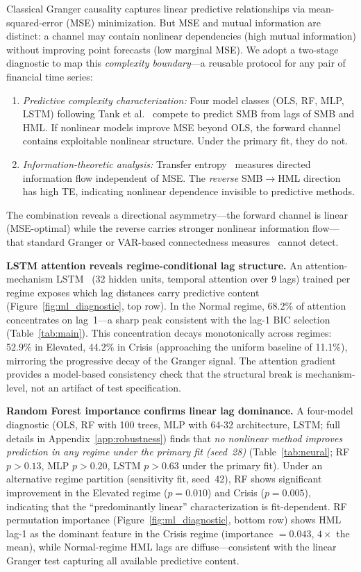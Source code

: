 \documentclass[sigconf,anonymous]{acmart}
\begin{document}
Classical Granger causality captures linear predictive relationships via
mean-squared-error (MSE) minimization. But MSE and mutual information are
distinct: a channel may contain nonlinear dependencies (high mutual
information) without improving point forecasts (low marginal MSE).
We adopt a two-stage diagnostic to map this \emph{complexity boundary}---a
reusable protocol for any pair of financial time series:
\begin{enumerate}
    \item \emph{Predictive complexity characterization:} Four model classes
    (OLS, RF, MLP, LSTM) following Tank et al.~\cite{tank2022neural} compete
    to predict SMB from lags of SMB and HML. If nonlinear models improve MSE
    beyond OLS, the forward channel contains exploitable nonlinear structure.
    Under the primary fit, they do not.
    \item \emph{Information-theoretic analysis:} Transfer
    entropy~\cite{schreiber2000measuring} measures directed information flow
    independent of MSE. The \emph{reverse} SMB$\to$HML direction has high TE,
    indicating nonlinear dependence invisible to predictive methods.
\end{enumerate}
The combination reveals a directional asymmetry---the forward channel is
linear (MSE-optimal) while the reverse carries stronger nonlinear information
flow---that standard Granger or VAR-based connectedness
measures~\cite{diebold2012better} cannot detect.

\textbf{LSTM attention reveals regime-conditional lag structure.}
An attention-mechanism LSTM~\cite{tank2022neural} (32 hidden units,
temporal attention over 9 lags) trained per regime exposes which lag
distances carry predictive content (Figure~\ref{fig:ml_diagnostic},
top row). In the Normal regime, 68.2\% of attention concentrates on
lag~1---a sharp peak consistent with the lag-1 BIC selection
(Table~\ref{tab:main}). This concentration decays monotonically across
regimes: 52.9\% in Elevated, 44.2\% in Crisis (approaching the uniform
baseline of 11.1\%), mirroring the progressive decay of the Granger
signal. The attention gradient provides a model-based consistency check that
the structural break is mechanism-level, not an artifact of test specification.

\textbf{Random Forest importance confirms linear lag dominance.}
A four-model diagnostic (OLS, RF with 100 trees, MLP with 64-32 architecture,
LSTM; full details in Appendix~\ref{app:robustness}) finds that
\emph{no nonlinear method improves prediction in any regime under the primary fit (seed~28)}
(Table~\ref{tab:neural}; RF $p > 0.13$, MLP $p > 0.20$, LSTM $p > 0.63$
under the primary fit). Under an alternative regime partition (sensitivity fit, seed~42), RF shows significant improvement in the Elevated regime ($p = 0.010$) and Crisis ($p = 0.005$), indicating that the ``predominantly linear'' characterization is fit-dependent.
RF permutation importance
(Figure~\ref{fig:ml_diagnostic}, bottom row) shows HML lag-1 as the
dominant feature in the Crisis regime (importance $= 0.043$,
$4\times$ the mean), while Normal-regime HML lags are diffuse---consistent
with the linear Granger test capturing all available predictive content.
\end{document}
